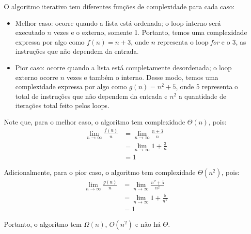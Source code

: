 O algoritmo iterativo tem diferentes funções de complexidade para cada caso:
\begin{itemize}
  \item Melhor caso: ocorre quando a lista está ordenada; o loop interno será executado $n$ vezes e o externo, somente 1. Portanto, temos uma complexidade expressa por algo como $f(n) = n + 3$, onde $n$ representa o loop \textit{for} e o 3, as instruções que não dependem da entrada.
  \item Pior caso: ocorre quando a lista está completamente desordenada; o loop externo ocorre $n$ vezes e também o interno. Desse modo, temos uma complexidade expressa por algo como $g(n) = n^2 + 5$, onde 5 representa o total de instruções que não dependem da entrada e $n^2$ a quantidade de iterações total feito pelos loops.
\end{itemize}

Note que, para o melhor caso, o algoritmo tem complexidade $\Theta(n)$, pois:
\begin{align*}
    \lim_{n\to\infty} \frac{f(n)}{n} &= \lim_{n\to\infty} \frac{n + 3}{n} \\
    &= \lim_{n\to\infty} 1 + \frac{3}{n} \\ 
    &= 1 
\end{align*}

Adicionalmente, para o pior caso, o algoritmo tem complexidade $\Theta(n^2)$, pois:
\begin{align*}
    \lim_{n\to\infty} \frac{g(n)}{n} &= \lim_{n\to\infty} \frac{n^2 + 5}{n^2} \\
    &= \lim_{n\to\infty} 1 + \frac{5}{n^2} \\ 
    &= 1 
\end{align*}

Portanto, o algoritmo tem $\Omega(n)$, $O(n^2)$ e não há $\Theta$.

